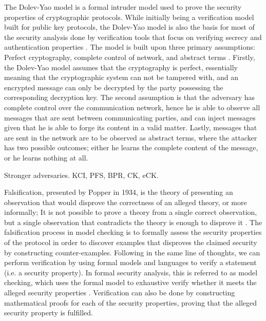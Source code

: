 
The Dolev-Yao model is a formal intruder model used to prove the security properties of cryptographic protocols. While initially being a verification model built for public key protocols, the Dolev-Yao model is also the basis for most of the security analysis done by verification tools that focus on verifying secrecy and authentication properties \cite{cremers2005operational}. The model is built upon three primary assumptions: Perfect cryptography, complete control of network, and abstract terms \cite{dolev1983security}. Firstly, the Dolev-Yao model assumes that the cryptography is perfect, essentially meaning that the cryptographic system can not be tampered with, and an encrypted message can only be decrypted by the party possessing the corresponding decryption key. The second assumption is that the adversary has complete control over the communication network, hence he is able to observe all messages that are sent between communicating parties, and can inject messages given that he is able to forge its content in a valid matter. Lastly, messages that are sent in the network are to be observed as abstract terms, where the attacker has two possible outcomes; either he learns the complete content of the message, or he learns nothing at all. 


Stronger adversaries. KCI, PFS, BPR, CK, eCK.



Falsification, presented by Popper in 1934, is the theory of presenting an observation that would disprove the correctness of an alleged theory, or more informally; It is not possible to prove a theory from a single correct observation, but a single observation that contradicts the theory is enough to disprove it \cite{popper2005logic}. The falsification process in model checking is to formally assess the security properties of the protocol in order to discover examples that disproves the claimed security by constructing counter-examples. Following in the same line of thoughts, we can perform verification by using formal models and languages to verify a statement (i.e. a security property). In formal security analysis, this is referred to as model checking, which uses the formal model to exhaustive verify whether it meets the alleged security properties \cite{basin2011model}. Verification can also be done by constructing mathematical proofs for each of the security properties, proving that the alleged security property is fulfilled. 


